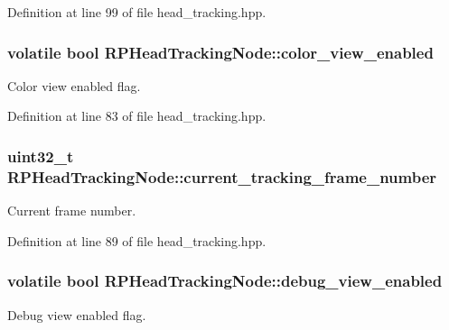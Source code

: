 \-Definition at line 99 of file head\-\_\-tracking.\-hpp.

\hypertarget{class_r_p_head_tracking_node_a90f29e5f81692d883b535c8ebcbf9cfc}{
\subsubsection[{color\-\_\-view\-\_\-enabled}]{\setlength{\rightskip}{0pt plus 5cm}volatile bool {\bf \-R\-P\-Head\-Tracking\-Node\-::color\-\_\-view\-\_\-enabled}}}\label{class_r_p_head_tracking_node_a90f29e5f81692d883b535c8ebcbf9cfc}
\-Color view enabled flag. 

\-Definition at line 83 of file head\-\_\-tracking.\-hpp.

\hypertarget{class_r_p_head_tracking_node_aec215913fa33464a7fd8e068b8947d61}{
\subsubsection[{current\-\_\-tracking\-\_\-frame\-\_\-number}]{\setlength{\rightskip}{0pt plus 5cm}uint32\-\_\-t {\bf \-R\-P\-Head\-Tracking\-Node\-::current\-\_\-tracking\-\_\-frame\-\_\-number}}}\label{class_r_p_head_tracking_node_aec215913fa33464a7fd8e068b8947d61}
\-Current frame number. 

\-Definition at line 89 of file head\-\_\-tracking.\-hpp.

\hypertarget{class_r_p_head_tracking_node_a1f2845c7ce72d1a8d117caebd1b1024f}{
\subsubsection[{debug\-\_\-view\-\_\-enabled}]{\setlength{\rightskip}{0pt plus 5cm}volatile bool {\bf \-R\-P\-Head\-Tracking\-Node\-::debug\-\_\-view\-\_\-enabled}}}\label{class_r_p_head_tracking_node_a1f2845c7ce72d1a8d117caebd1b1024f}
\-Debug view enabled flag. 

